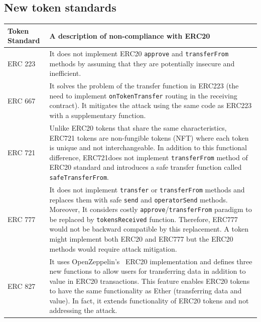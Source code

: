 
\subsection{New token standards}

\begin{table}
\centering
\def\arraystretch{1.2}%
\begin{tabular}{|m{1.8cm}|m{14.5cm}|}
	\hline\centering
	\textbf{Token Standard} & \textbf{A description of non-compliance with ERC20}\\
	\hline\hline\centering
	ERC 223 \cite{Ref20} & It does not implement ERC20 \texttt{approve} and \texttt{transferFrom} methods by assuming that they are potentially insecure and inefficient.\\ 
	\hline\centering 
	ERC 667 \cite{Ref21} & It solves the problem of the transfer function in ERC223 (\ie the need to implement \texttt{onTokenTransfer} routing in the receiving contract). It mitigates the attack using the same code as ERC223 with a supplementary function.\\ 
	\hline\centering 
	ERC 721 \cite{Ref22} & Unlike ERC20 tokens that share the same characteristics, ERC721 tokens are non-fungible tokens (NFT) where each token is unique and not interchangeable. In addition to this functional difference, ERC721does not implement \texttt{transferFrom} method of ERC20 standard and introduces a safe transfer function called \texttt{safeTransferFrom}.\\ 
	\hline\centering
	ERC 777 \cite{Ref23} & It does not implement \texttt{transfer} or \texttt{transferFrom} methods and replaces them with safe \texttt{send} and \texttt{operatorSend} methods. Moreover, It considers costly \texttt{approve}/\texttt{transferFrom} paradigm to be replaced by \texttt{tokensReceived} function. Therefore, ERC777 would not be backward compatible by this replacement. A token might implement both ERC20 and ERC777 but the ERC20 methods would require attack mitigation.\\ 
	\hline\centering 
	ERC 827 \cite{Ref24} & It uses OpenZeppelin's~\cite{Ref10} ERC20 implementation and defines three new functions to allow users for transferring data in addition to value in ERC20 transactions. This feature enables ERC20 tokens to have the same functionality as Ether (transferring data and value). In fact, it extends functionality of ERC20 tokens and not addressing the attack. \\ 

\end{tabular}
\end{table}
